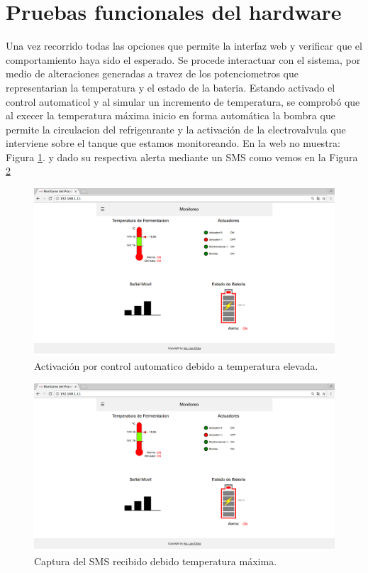 
\section{Pruebas funcionales del hardware}
\label{sec:pruebasHW}

Una vez recorrido todas las opciones que permite la interfaz web y verificar que el comportamiento haya sido el esperado. Se procede interactuar con el sistema, por medio de alteraciones generadas a travez de los potenciometros que representarian la temperatura y el estado de la bateria.
Estando activado el control automaticol y al simular un incremento de temperatura, se comprobó que al execer la temperatura máxima inicio en forma automática la bombra que permite la circulacion del refrigenrante y la activación de la electrovalvula que interviene sobre el tanque que estamos monitoreando. En la web no muestra: Figura \ref{fig:auto_control_active}. y dado su respectiva alerta mediante un SMS como vemos en la Figura \ref{fig:sms_temp_max}

\begin{figure}[h]
  \centering
  \includegraphics[scale=.25]{./Figures/auto_control_active.png}
  \caption{Activación por control automatico debido a temperatura elevada.}
  \label{fig:auto_control_active}
\end{figure}


\begin{figure}[h]
  \centering
  \includegraphics[scale=.05]{./Figures/auto_control_active.png}
  \caption{Captura del SMS recibido debido temperatura máxima.}
  \label{fig:sms_temp_max}
\end{figure}

